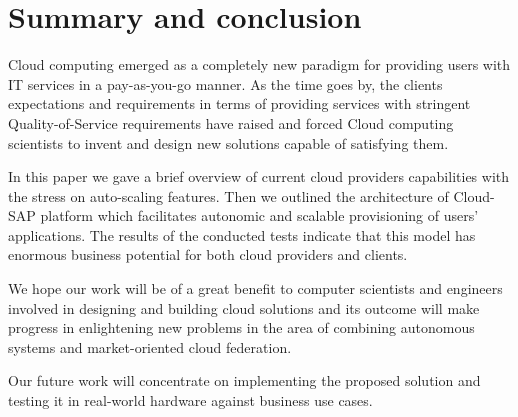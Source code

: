 \documentclass[twocolumn]{svjour3}          %
\begin{document}
\section{Summary and conclusion}
Cloud computing emerged as a completely new paradigm for providing users with IT services in a pay-as-you-go manner. As the time goes by, the clients expectations and requirements in terms of providing services with stringent Quality-of-Service requirements have raised and forced Cloud computing scientists to invent and design new solutions capable of satisfying them.

In this paper we gave a brief overview of current cloud providers capabilities with the stress on auto-scaling features. Then we outlined the architecture of Cloud-SAP platform which facilitates autonomic and scalable provisioning of users' applications. The results of the conducted tests indicate that this model has enormous business potential for both cloud providers and clients.

We hope our work will be of a great benefit to computer scientists and engineers involved in designing and building cloud solutions and its outcome will make progress in enlightening new problems in the area of combining autonomous systems and market-oriented cloud federation.

Our future work will concentrate on implementing the proposed solution and testing it in real-world hardware against business use cases.

\end{document}
